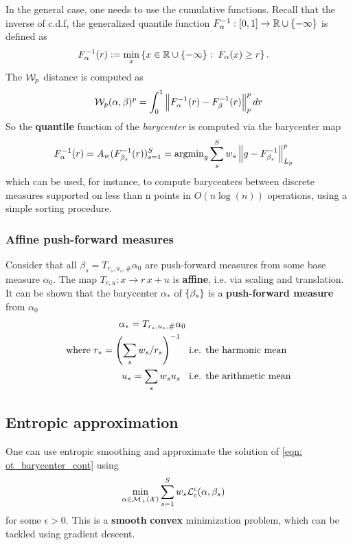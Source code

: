 \documentclass[11pt]{article}
\begin{document}
In the general case, one needs to use the cumulative functions. Recall that the inverse of c.d.f,  the generalized quantile function $F_{\alpha}^{-1}: [0,1] \rightarrow {\mathbb R}\cup\left\{-\infty\right\}$ is defined as
\begin{align*}
F_{\alpha}^{-1}(r) &:= \min_{x}\left\{x \in {\mathbb R}\cup\left\{-\infty\right\}: \; F_{\alpha}(x) \ge r\right\}. 
\end{align*} The ${\mathcal W}_{p}$ distance is computed as 
\begin{align*}
{\mathcal W}_{p}(\alpha, \beta)^{p} = \int_{0}^{1}\left\|F_{\alpha}^{-1}(r) - F_{\beta}^{-1}(r)\right\|_{p}^{p} dr 
\end{align*} So the \textbf{quantile} function of the \emph{barycenter} is computed via the barycenter map
\begin{align*}
F^{-1}_{\alpha}(r) &= A_{w}(F^{-1}_{\beta_{s}}(r))_{s=1}^{S} = \operatorname{argmin}_{g}\sum_{s}^{S}w_{s} \left\|g- F_{\beta_s}^{-1}\right\|_{L_p}^{p}
\end{align*} which can be used, for instance, to compute barycenters between discrete measures supported on less than n points in $O(n \log(n))$ operations, using a simple sorting procedure.

\subsubsection{Affine push-forward measures}
Consider that all $\beta_{s} = T_{r_s, u_s,\#}\alpha_{0}$ are push-forward measures from some base measure $\alpha_0$. The map $T_{r, u}: x \rightarrow r\,x + u$ is \textbf{affine}, i.e. via scaling and translation. It can be shown that the barycenter $\alpha_{*}$ of $\left\{\beta_{s}\right\}$ is a \textbf{push-forward measure} from  $\alpha_{0}$
\begin{align*}
\alpha_{*} = T_{r_{*}, u_{*},\#}\alpha_{0} &\\
\text{where } r_{*} = \left(\sum_{s}w_s / r_{s} \right)^{-1}\;\; &\text{ i.e. the harmonic mean}\\
u_{*} = \sum_{s}w_{s} u_s  \;\;&\text{ i.e. the arithmetic mean}
\end{align*}

\subsection{Entropic approximation}
One can use entropic smoothing and approximate the solution of \eqref{eqn: ot_barycenter_cont} using
\begin{align}
\min_{\alpha \in {\mathcal M}_{+}({\mathcal X})}& \sum_{s=1}^{S}w_{s}{\mathcal L}_{c}^{\epsilon}(\alpha, \beta_{s}) \label{eqn: ot_barycenter_ent_cont}
\end{align} for some $\epsilon >0$. This is a \textbf{smooth} \textbf{convex} minimization problem, which can be tackled using gradient descent. 
\end{document}
